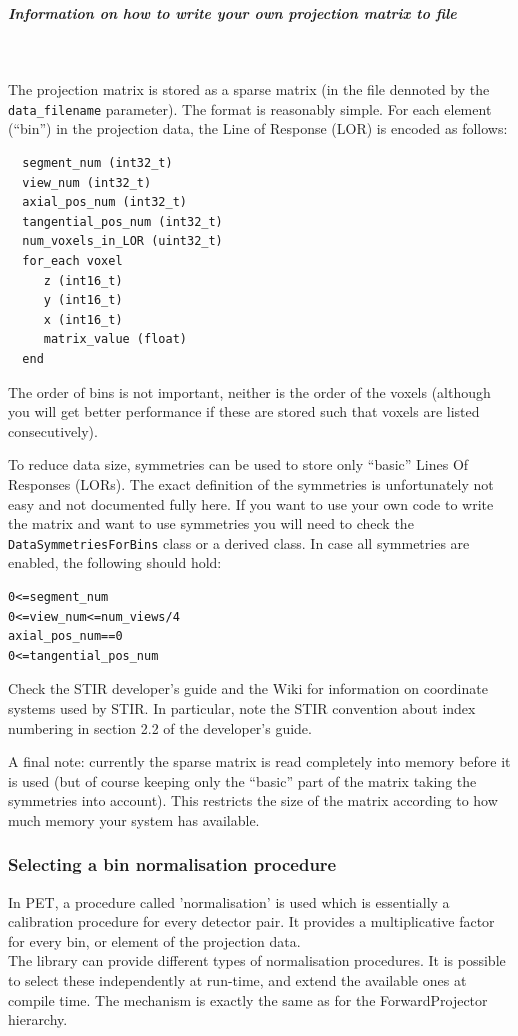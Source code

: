 \documentclass{article}
\newcommand{\subsubsubsubsection}[1]{\subparagraph{#1} \mbox{} \\}
\begin{document}
{{{{{{{ \subsubsubsubsection{Information on how to write your own projection matrix to file}
}
The projection matrix is stored as a sparse matrix (in the file dennoted by the \texttt{data\_filename}
parameter). The format is reasonably simple. For each element (``bin'') in the projection data, the 
Line of Response (LOR) is encoded as follows:
\begin{verbatim}
  segment_num (int32_t)
  view_num (int32_t)
  axial_pos_num (int32_t)
  tangential_pos_num (int32_t)
  num_voxels_in_LOR (uint32_t)
  for_each voxel
     z (int16_t)
     y (int16_t)
     x (int16_t)
     matrix_value (float)
  end
\end{verbatim}
The order of bins is not important, neither is the order of the voxels (although you will get better
performance if these are stored such that voxels are listed consecutively).

To reduce data size, symmetries can be used to store only ``basic'' Lines Of Responses (LORs). 
The exact definition of the symmetries is unfortunately
not easy and not documented fully here. If you want to use your own code to write the matrix and want to use
symmetries you will need to check the \texttt{DataSymmetriesForBins} class or a derived class. In case all
symmetries are enabled, the following should hold:
\begin{verbatim}
0<=segment_num
0<=view_num<=num_views/4
axial_pos_num==0
0<=tangential_pos_num
\end{verbatim}
Check the STIR developer's guide and the Wiki for information on coordinate systems used by STIR. In particular,
note the STIR convention about index numbering in section 2.2 of the developer's guide.

A final note: currently the sparse matrix is read completely into memory before it is used (but of course
keeping only the ``basic'' part of the matrix taking the symmetries into account). This restricts the size
of the matrix according to how much memory your system has available.

\subsubsection{
Selecting a bin normalisation procedure}
\label{sec:binnormalisation}
In PET, a procedure called 'normalisation' is used which is essentially 
a calibration procedure for every detector pair. It provides 
a multiplicative factor for every bin, or element of the projection 
data.\\
The library can provide different types of normalisation procedures. 
It is possible to select these independently at run-time, and 
extend the available ones at compile time. The mechanism is exactly 
the same as for the ForwardProjector hierarchy.


}}}}}}
\end{document}
